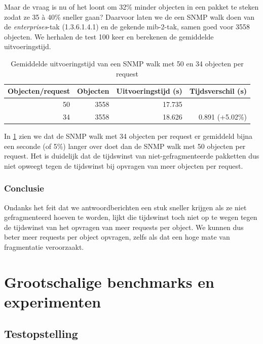 Maar de vraag is nu of het loont om 32\% minder objecten in een pakket te steken zodat ze 35 à 40\% sneller gaan?
Daarvoor laten we de \nwmretriever{} een SNMP walk doen van de \textit{enterprises}-tak (1.3.6.1.4.1) en de gekende mib-2-tak, samen goed voor 3558 objecten.
We herhalen de test 100 keer en berekenen de gemiddelde uitvoeringstijd.

\begin{table}[h]
\centering
\begin{tabular}{@{}rrrr@{}}
\toprule
Objecten/request & Objecten & Uitvoeringstijd (s) & Tijdsverschil (s) \\ \midrule
50               & 3558     & 17.735              &                   \\
34               & 3558     & 18.626              & 0.891 (+5.02\%)   \\ \bottomrule
\end{tabular}
\caption{Gemiddelde uitvoeringstijd van een SNMP walk met 50 en 34 objecten per request}
\label{tabel-fragmentatie-uitvoeringstijd}
\end{table}

In \cref{tabel-fragmentatie-uitvoeringstijd} zien we dat de SNMP walk met 34 objecten per request er gemiddeld bijna een seconde (of 5\%) langer over doet
dan de SNMP walk met 50 objecten per request.
Het is duidelijk dat de tijdswinst van niet-gefragmenteerde pakketten dus niet opweegt tegen de tijdswinst bij opvragen van meer objecten per request.

\subsubsection{Conclusie}

Ondanks het feit dat we antwoordberichten een stuk sneller krijgen als ze niet gefragmenteerd hoeven te worden,
lijkt die tijdswinst toch niet op te wegen tegen de tijdswinst van het opvragen van meer requests per object.
We kunnen dus beter meer requests per object opvragen, zelfs als dat een hoge mate van fragmentatie veroorzaakt.


\section{Grootschalige benchmarks en experimenten}


\subsection{Testopstelling}

